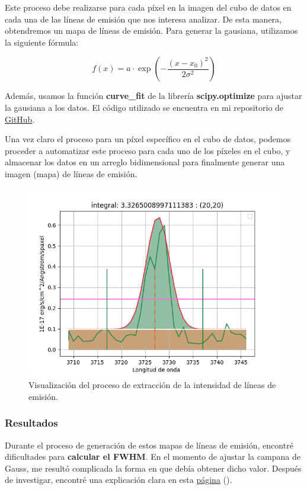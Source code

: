 \documentclass[9pt,twocolumn,a4paper]{opticajnl}
\begin{document}
Este proceso debe realizarse para cada píxel en la imagen del cubo de datos en cada una de las líneas de emisión que nos interesa analizar. De esta manera, obtendremos un mapa de líneas de emisión. Para generar la gausiana, utilizamos la siguiente fórmula:

$$
f(x) = a \cdot \exp\left( -\frac{(x - x_0)^2}{2\sigma^2} \right)
$$

Además, usamos la función \textbf{curve\_fit} de la librería \textbf{scipy.optimize} para ajustar la gausiana a los datos. El código utilizado se encuentra en mi repositorio de \href{https://github.com/renatosanz/delfin}{GitHub}.

Una vez claro el proceso para un píxel específico en el cubo de datos, podemos proceder a automatizar este proceso para cada uno de los píxeles en el cubo, y almacenar los datos en un arreglo bidimensional para finalmente generar una imagen (mapa) de líneas de emisión.

\begin{figure}
    \centering
    \includegraphics[width=1\linewidth]{extraccion_linea.png}
    \caption{Visualización del proceso de extracción de la intensidad de líneas de emisión.}
    \label{fig:extraccion_linea}
\end{figure}

\subsubsection*{Resultados}

Durante el proceso de generación de estos mapas de líneas de emisión, encontré dificultades para \textbf{calcular el FWHM}. En el momento de ajustar la campana de Gauss, me resultó complicada la forma en que debía obtener dicho valor. Después de investigar, encontré una explicación clara en esta \href{https://www.pulstec.net/what-is-full-width-at-half-maximum/}{página} (\cite{suzuki2023fwhm}).
\end{document}
